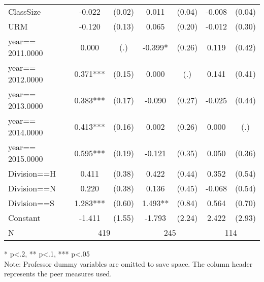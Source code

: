 \begin{sidewaystable}[htb]
\begin{threeparttable}
\begin{tabular}{l|c|c|c|c|c|c}
      ClassSize           &      -0.022                       &      (0.02)   &       0.011                       &      (0.04)   &      -0.008                       &      (0.04)   \\
      URM                 &      -0.120                       &      (0.13)   &       0.065                       &      (0.20)   &      -0.012                       &      (0.30)   \\
      year==  2011.0000   &       0.000                       &         (.)   &      -0.399*                      &      (0.26)   &       0.119                       &      (0.42)   \\
      year==  2012.0000   &       0.371***                    &      (0.15)   &       0.000                       &         (.)   &       0.141                       &      (0.41)   \\
      year==  2013.0000   &       0.383***                    &      (0.17)   &      -0.090                       &      (0.27)   &      -0.025                       &      (0.44)   \\
      year==  2014.0000   &       0.413***                    &      (0.16)   &       0.002                       &      (0.26)   &       0.000                       &         (.)   \\
      year==  2015.0000   &       0.595***                    &      (0.19)   &      -0.121                       &      (0.35)   &       0.050                       &      (0.36)   \\
      Division==H         &       0.411                       &      (0.38)   &       0.422                       &      (0.44)   &       0.352                       &      (0.54)   \\
      Division==N         &       0.220                       &      (0.38)   &       0.136                       &      (0.45)   &      -0.068                       &      (0.54)   \\
      Division==S         &       1.283***                    &      (0.60)   &       1.493**                     &      (0.84)   &       0.564                       &      (0.70)   \\
      Constant            &      -1.411                       &      (1.55)   &      -1.793                       &      (2.24)   &       2.422                       &      (2.93)   \\
      \hline
      N                 & \multicolumn{2}{|c}{419} & \multicolumn{2}{|c}{245} & \multicolumn{2}{|c}{114}               \\
      \hline
      \hline
    \end{tabular}
    \begin{tablenotes}
    \item{* p<.2, ** p<.1, *** p<.05 \\ Note: Professor dummy variables are omitted to save space. The column header represents the peer measures used.}
    \end{tablenotes}
  \end{threeparttable}
\end{sidewaystable}

